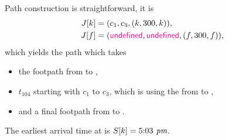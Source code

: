 	Path construction is straightforward, it is
	\begin{align*}
		J[k]	&= (c_1, c_3, (k, 300, k)),\\
		J[f]	&= (\textcolor{magenta}{\textsf{undefined}}, \textcolor{magenta}{\textsf{undefined}}, (f, 300, f)),
	\end{align*}
	which yields the path which takes
	\begin{itemize}
		\item[] the footpath from \freiburg to \freiburg,
		\item[] $t_{104}$ starting with $c_1$ to $c_3$, which is using the \ticef from \freiburg to \karlsruhe,
		\item[] and a final footpath from \karlsruhe to \karlsruhe.
	\end{itemize}
	The earliest arrival time at \karlsruhe is $S[k] = 5\text{:}03\textit{ pm}$.
	
